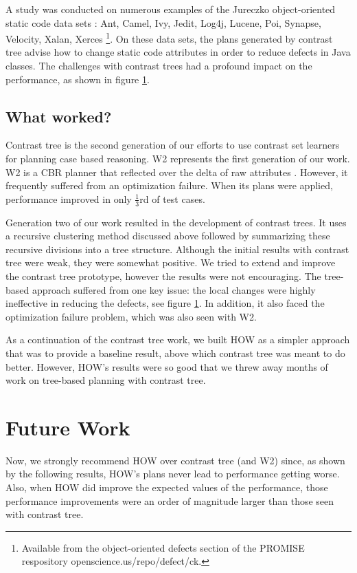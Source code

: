 \documentclass[conference]{IEEEtran}
\begin{document}
	A study was conducted on numerous examples of the Jureczko object-oriented static code data sets \cite{}: Ant, Camel, Ivy, Jedit, Log4j, Lucene, Poi, Synapse, Velocity, Xalan, Xerces \footnote{Available from the object-oriented defects section of the PROMISE respository openscience.us/repo/defect/ck.}. On these data sets, the plans generated by contrast tree advise
	how to change static code attributes in order to reduce defects in Java classes. The challenges with contrast trees had a profound impact on the performance, as shown in figure \ref{}.
	\subsection{What worked?}
	Contrast tree is the second generation of our efforts to use contrast set learners for planning case based reasoning. W2 represents the first generation of our work. W2 is a CBR planner that reflected over the delta of raw attributes \cite{}. However, it frequently suffered from an optimization failure. When its plans were applied, performance improved in only  $\tfrac{1}{3}$rd of test cases. 
	
	Generation two of our work resulted in the development of contrast trees. It uses a recursive clustering method discussed above followed by summarizing these recursive divisions into a tree structure. Although the initial results with contrast tree were weak, they were somewhat positive. We tried to extend and improve the contrast tree prototype, however the results were not encouraging. The tree-based approach suffered from one key issue: the local changes were highly ineffective in reducing the defects, see figure \ref{}. In addition, it also faced the optimization failure problem, which was also seen with W2. 
	
	As a continuation of the contrast tree work, we built HOW as a simpler approach that was to provide a baseline result, above which contrast tree was meant to do better. However, HOW’s results were so good that we threw away months of work on tree-based planning with contrast tree. 
	\section{Future Work}
	Now, we strongly recommend HOW over contrast tree (and W2) since, as shown by the following results, HOW’s plans never lead to performance getting worse. Also, when HOW did improve the expected values of the performance, those performance improvements were an order of magnitude larger than those seen with contrast tree. 


\end{document}
